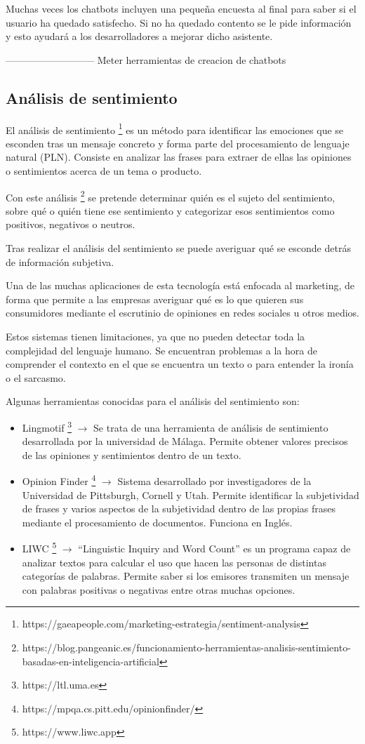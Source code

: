 Muchas veces los chatbots incluyen una pequeña encuesta al final para saber si el usuario ha quedado satisfecho. Si no ha quedado contento se le pide información y esto ayudará a los desarrolladores a mejorar dicho asistente.


--------------------------- Meter herramientas de creacion de chatbots

\subsection{Análisis de sentimiento}

El análisis de sentimiento \footnote{https://gaeapeople.com/marketing-estrategia/sentiment-analysis} es un método para identificar las emociones que se esconden tras un mensaje concreto y forma parte del procesamiento de lenguaje natural (PLN). Consiste en analizar las frases para extraer de ellas las opiniones o sentimientos acerca de un tema o producto.

Con este análisis \footnote{https://blog.pangeanic.es/funcionamiento-herramientas-analisis-sentimiento-basadas-en-inteligencia-artificial} se pretende determinar quién es el sujeto del sentimiento, sobre qué o quién tiene ese sentimiento y categorizar esos sentimientos como positivos, negativos o neutros.

Tras realizar el análisis del sentimiento se puede averiguar qué se esconde detrás de información subjetiva.

Una de las muchas aplicaciones de esta tecnología está enfocada al marketing, de forma que permite a las empresas averiguar qué es lo que quieren sus consumidores mediante el escrutinio de opiniones en redes sociales u otros medios.

Estos sistemas tienen limitaciones, ya que no pueden detectar toda la complejidad del lenguaje humano. Se encuentran problemas a la hora de comprender el contexto en el que se encuentra un texto o para entender la ironía o el sarcasmo.

Algunas herramientas conocidas para el análisis del sentimiento son:
\begin{itemize}
	\item Lingmotif \footnote{https://ltl.uma.es} $\rightarrow$ Se trata de una herramienta de análisis de sentimiento desarrollada por la universidad de Málaga. Permite obtener valores precisos de las opiniones y sentimientos dentro de un texto.
	\item Opinion Finder \footnote{https://mpqa.cs.pitt.edu/opinionfinder/} $\rightarrow$ Sistema desarrollado por investigadores de la Universidad de Pittsburgh, Cornell y Utah. Permite identificar la subjetividad de frases y varios aspectos de la subjetividad dentro de las propias frases mediante el procesamiento de documentos. Funciona en Inglés.
	\item LIWC \footnote{https://www.liwc.app} $\rightarrow$ ``Linguistic Inquiry and Word Count'' es un programa capaz de analizar textos para calcular el uso que hacen las personas de distintas categorías de palabras. Permite saber si los emisores transmiten un mensaje con palabras positivas o negativas entre otras muchas opciones.
\end{itemize}


